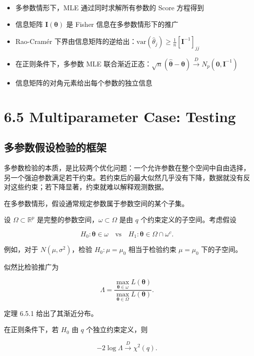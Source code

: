 \begin{itemize}
\item 多参数情形下，MLE 通过同时求解所有参数的 Score 方程得到
\item 信息矩阵 $\mathbf{I}(\boldsymbol{\theta})$ 是 Fisher 信息在多参数情形下的推广
\item Rao-Cramér 下界由信息矩阵的逆给出：$\text{var}(\widehat{\theta}_j) \geq \frac{1}{n}[\mathbf{I}^{-1}]_{jj}$
\item 在正则条件下，多参数 MLE 联合渐近正态：$\sqrt{n}(\widehat{\boldsymbol{\theta}} - \boldsymbol{\theta}) \xrightarrow{D} N_p(\mathbf{0}, \mathbf{I}^{-1})$
\item 信息矩阵的对角元素给出每个参数的独立信息
\end{itemize}

\section{6.5 Multiparameter Case: Testing}\label{sec:6.5}

\subsection{多参数假设检验的框架}

多参数检验的本质，是比较两个优化问题：一个允许参数在整个空间中自由选择，另一个强迫参数满足若干约束。若约束后的最大似然几乎没有下降，数据就没有反对这些约束；若下降显著，约束就难以解释观测数据。

在多参数情形，假设通常规定参数属于参数空间的某个子集。

设 $\Omega \subset \mathbb{R}^p$ 是完整的参数空间，$\omega \subset \Omega$ 是由 $q$ 个约束定义的子空间。考虑假设

\[
H_0: \boldsymbol{\theta} \in \omega \quad \text{vs} \quad H_1: \boldsymbol{\theta} \in \Omega \cap \omega^c.
\label{eq:multiparameter-hypothesis}
\]

例如，对于 $N(\mu, \sigma^2)$，检验 $H_0: \mu = \mu_0$ 相当于检验约束 $\mu = \mu_0$ 下的子空间。

似然比检验推广为

\[
\Lambda = \frac{\max_{\boldsymbol{\theta} \in \omega} L(\boldsymbol{\theta})}{\max_{\boldsymbol{\theta} \in \Omega} L(\boldsymbol{\theta})}.
\label{eq:multiparameter-lrt}
\]

定理 6.5.1 给出了其渐近分布。

\begin{theorem}[多参数似然比检验的渐近分布]\label{th:multiparameter-lrt}
在正则条件下，若 $H_0$ 由 $q$ 个独立约束定义，则

\[
-2\log\Lambda \xrightarrow{D} \chi^2(q).
\label{eq:multiparameter-lrt-asymptotic}
\]
\end{theorem}

